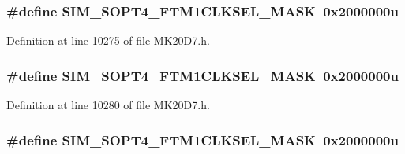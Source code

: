 \subsubsection[{\texorpdfstring{S\+I\+M\+\_\+\+S\+O\+P\+T4\+\_\+\+F\+T\+M1\+C\+L\+K\+S\+E\+L\+\_\+\+M\+A\+SK}{SIM_SOPT4_FTM1CLKSEL_MASK}}]{\setlength{\rightskip}{0pt plus 5cm}\#define S\+I\+M\+\_\+\+S\+O\+P\+T4\+\_\+\+F\+T\+M1\+C\+L\+K\+S\+E\+L\+\_\+\+M\+A\+SK~0x2000000u}\hypertarget{group___s_i_m___register___masks_ga0cd5cb92a9ea79e8227693c793ee5983}{}\label{group___s_i_m___register___masks_ga0cd5cb92a9ea79e8227693c793ee5983}


Definition at line 10275 of file M\+K20\+D7.\+h.

\subsubsection[{\texorpdfstring{S\+I\+M\+\_\+\+S\+O\+P\+T4\+\_\+\+F\+T\+M1\+C\+L\+K\+S\+E\+L\+\_\+\+M\+A\+SK}{SIM_SOPT4_FTM1CLKSEL_MASK}}]{\setlength{\rightskip}{0pt plus 5cm}\#define S\+I\+M\+\_\+\+S\+O\+P\+T4\+\_\+\+F\+T\+M1\+C\+L\+K\+S\+E\+L\+\_\+\+M\+A\+SK~0x2000000u}\hypertarget{group___s_i_m___register___masks_ga0cd5cb92a9ea79e8227693c793ee5983}{}\label{group___s_i_m___register___masks_ga0cd5cb92a9ea79e8227693c793ee5983}


Definition at line 10280 of file M\+K20\+D7.\+h.

\subsubsection[{\texorpdfstring{S\+I\+M\+\_\+\+S\+O\+P\+T4\+\_\+\+F\+T\+M1\+C\+L\+K\+S\+E\+L\+\_\+\+M\+A\+SK}{SIM_SOPT4_FTM1CLKSEL_MASK}}]{\setlength{\rightskip}{0pt plus 5cm}\#define S\+I\+M\+\_\+\+S\+O\+P\+T4\+\_\+\+F\+T\+M1\+C\+L\+K\+S\+E\+L\+\_\+\+M\+A\+SK~0x2000000u}\hypertarget{group___s_i_m___register___masks_ga0cd5cb92a9ea79e8227693c793ee5983}{}\label{group___s_i_m___register___masks_ga0cd5cb92a9ea79e8227693c793ee5983}


